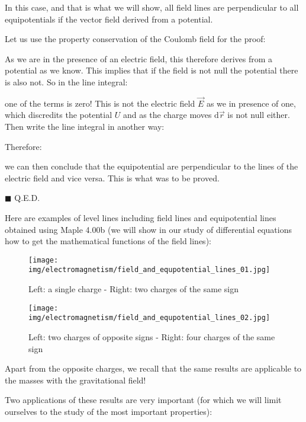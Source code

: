 	\begin{theorem}
	In this case, and that is what we will show, all field lines are perpendicular to all equipotentials if the vector field derived from a potential.
	\end{theorem}
	Let us use the property conservation of the Coulomb field for the proof:
	\begin{dem}
	
	As we are in the presence of an electric field, this therefore derives from a potential as we know. This implies that if the field is not null the potential there is also not. So in the line integral:
	
	one of the terms is zero! This is not the electric field $\vec{E}$ as we in presence of one, which discredits the potential $U$ and as the charge moves $\mathrm{d}\vec{r}$ is not null either. Then write the line integral in another way:
	
	Therefore:
	
	we can then conclude that the equipotential are perpendicular to the lines of the electric field and vice versa. This is what was to be proved.
	\begin{flushright}
		$\blacksquare$  Q.E.D.
	\end{flushright}
	\end{dem}
	Here are examples of level lines including field lines and equipotential lines obtained using Maple 4.00b (we will show in our study of differential equations how to get the mathematical functions of the field lines):
	\begin{figure}[H]
		\centering
		\texttt{[image: img/electromagnetism/field\_and\_equpotential\_lines\_01.jpg]}
		\caption[]{Left: a single charge - Right: two charges of the same sign}
		\texttt{[image: img/electromagnetism/field\_and\_equpotential\_lines\_02.jpg]}
		\caption[]{Left: two charges of opposite signs - Right: four charges of the same sign}
	\end{figure}
	\begin{tcolorbox}[title=Remark,colframe=black,arc=10pt]
	Apart from the opposite charges, we recall that the same results are applicable to the masses with the gravitational field!
	\end{tcolorbox}
	Two applications of these results are very important (for which we will limit ourselves to the study of the most important properties):
